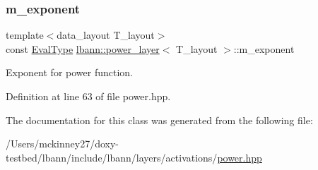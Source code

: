 \subsubsection{\texorpdfstring{m\+\_\+exponent}{m\_exponent}}
{\footnotesize\ttfamily template$<$data\+\_\+layout T\+\_\+layout$>$ \\
const \hyperlink{base_8hpp_a3266f5ac18504bbadea983c109566867}{Eval\+Type} \hyperlink{classlbann_1_1power__layer}{lbann\+::power\+\_\+layer}$<$ T\+\_\+layout $>$\+::m\+\_\+exponent\hspace{0.3cm}{\ttfamily [private]}}

Exponent for power function. 

Definition at line 63 of file power.\+hpp.



The documentation for this class was generated from the following file\+:\begin{DoxyCompactItemize}
\item 
/\+Users/mckinney27/doxy-\/testbed/lbann/include/lbann/layers/activations/\hyperlink{power_8hpp}{power.\+hpp}\end{DoxyCompactItemize}
